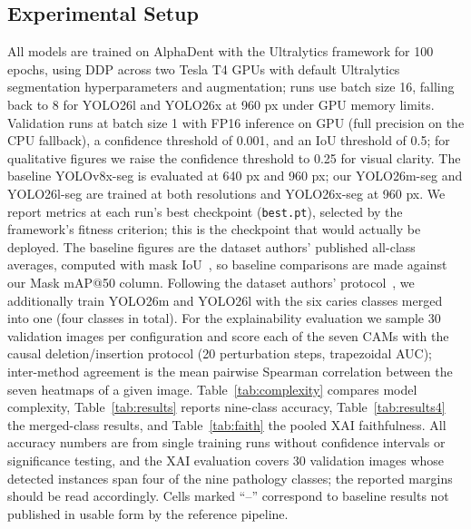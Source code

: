 \documentclass[conference]{IEEEtran}
\begin{document}
\subsection{Experimental Setup}
All models are trained on AlphaDent with the Ultralytics framework for 100 epochs, using DDP across two Tesla T4 GPUs with default Ultralytics segmentation hyperparameters and augmentation; runs use batch size 16, falling back to 8 for YOLO26l and YOLO26x at 960 px under GPU memory limits. Validation runs at batch size 1 with FP16 inference on GPU (full precision on the CPU fallback), a confidence threshold of 0.001, and an IoU threshold of 0.5; for qualitative figures we raise the confidence threshold to 0.25 for visual clarity. The baseline YOLOv8x-seg is evaluated at 640 px and 960 px; our YOLO26m-seg and YOLO26l-seg are trained at both resolutions and YOLO26x-seg at 960 px. We report metrics at each run's best checkpoint (\texttt{best.pt}), selected by the framework's fitness criterion; this is the checkpoint that would actually be deployed. The baseline figures are the dataset authors' published all-class averages, computed with mask IoU~\cite{sosnin2025alphadent}, so baseline comparisons are made against our Mask mAP@50 column. Following the dataset authors' protocol~\cite{sosnin2025alphadent}, we additionally train YOLO26m and YOLO26l with the six caries classes merged into one (four classes in total). For the explainability evaluation we sample 30 validation images per configuration and score each of the seven CAMs with the causal deletion/insertion protocol (20 perturbation steps, trapezoidal AUC); inter-method agreement is the mean pairwise Spearman correlation between the seven heatmaps of a given image. Table~\ref{tab:complexity} compares model complexity, Table~\ref{tab:results} reports nine-class accuracy, Table~\ref{tab:results4} the merged-class results, and Table~\ref{tab:faith} the pooled XAI faithfulness. All accuracy numbers are from single training runs without confidence intervals or significance testing, and the XAI evaluation covers 30 validation images whose detected instances span four of the nine pathology classes; the reported margins should be read accordingly. Cells marked ``--'' correspond to baseline results not published in usable form by the reference pipeline.
\end{document}
